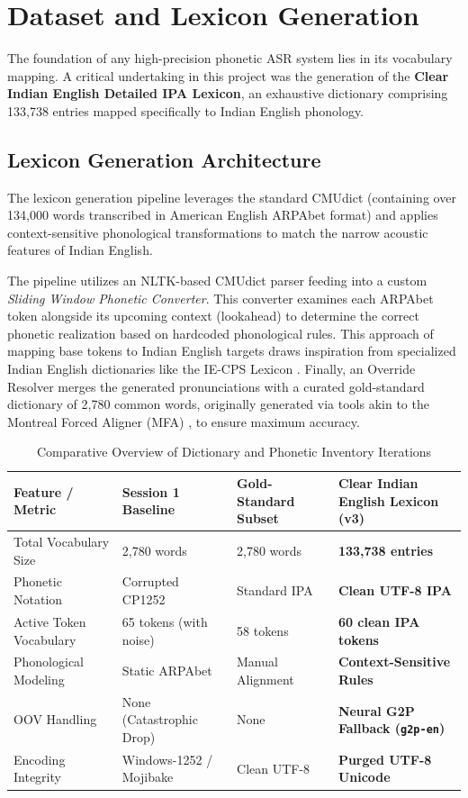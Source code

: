 \chapter{Dataset and Lexicon Generation}

The foundation of any high-precision phonetic ASR system lies in its vocabulary mapping. A critical undertaking in this project was the generation of the \textbf{Clear Indian English Detailed IPA Lexicon}, an exhaustive dictionary comprising 133,738 entries mapped specifically to Indian English phonology.

\section{Lexicon Generation Architecture}
The lexicon generation pipeline leverages the standard CMUdict (containing over 134,000 words transcribed in American English ARPAbet format) and applies context-sensitive phonological transformations to match the narrow acoustic features of Indian English.

The pipeline utilizes an NLTK-based CMUdict parser feeding into a custom \textit{Sliding Window Phonetic Converter}. This converter examines each ARPAbet token alongside its upcoming context (lookahead) to determine the correct phonetic realization based on hardcoded phonological rules. This approach of mapping base tokens to Indian English targets draws inspiration from specialized Indian English dictionaries like the IE-CPS Lexicon \cite{pandey2019iecps}. Finally, an Override Resolver merges the generated pronunciations with a curated gold-standard dictionary of 2,780 common words, originally generated via tools akin to the Montreal Forced Aligner (MFA) \cite{mcauliffe17_interspeech}, to ensure maximum accuracy.

\begin{table}[h]
    \centering
    \small
    \caption{Comparative Overview of Dictionary and Phonetic Inventory Iterations}
    \label{tab:dictionary_comparison}
    \begin{tabular}{p{3.5cm} p{3.5cm} p{3.5cm} p{4.0cm}}
        \toprule
        \textbf{Feature / Metric} & \textbf{Session 1 Baseline} & \textbf{Gold-Standard Subset} & \textbf{Clear Indian English Lexicon (v3)} \\
        \midrule
        Total Vocabulary Size & 2,780 words & 2,780 words & \textbf{133,738 entries} \\
        Phonetic Notation & Corrupted CP1252 & Standard IPA & \textbf{Clean UTF-8 IPA} \\
        Active Token Vocabulary & 65 tokens (with noise) & 58 tokens & \textbf{60 clean IPA tokens} \\
        Phonological Modeling & Static ARPAbet & Manual Alignment & \textbf{Context-Sensitive Rules} \\
        OOV Handling & None (Catastrophic Drop) & None & \textbf{Neural G2P Fallback (\texttt{g2p-en})} \\
        Encoding Integrity & Windows-1252 / Mojibake & Clean UTF-8 & \textbf{Purged UTF-8 Unicode} \\
        \bottomrule
    \end{tabular}
\end{table}

